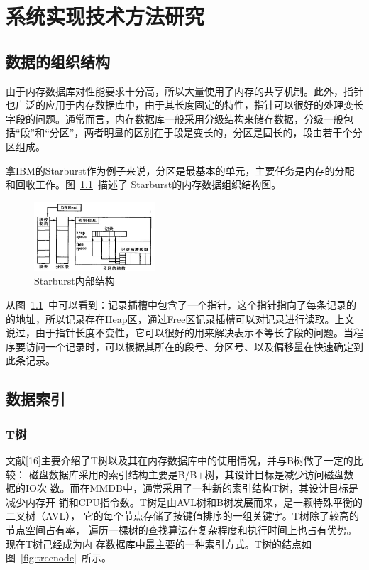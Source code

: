 \documentclass[literaturereview]{zjutreport}
\begin{document}
\chapter{系统实现技术方法研究}
\section{数据的组织结构}
由于内存数据库对性能要求十分高，所以大量使用了内存的共享机制。此外，指针也广泛的应用于内存数据库中，由于其长度固定的特性，指针可以很好的处理变长字段的问题。通常而言，内存数据库一般采用分级结构来储存数据，分级一般包括“段”和“分区”，两者明显的区别在于段是变长的，分区是固长的，段由若干个分区组成。

拿IBM的Starburst作为例子来说，分区是最基本的单元，主要任务是内存的分配和回收工作。图~\ref{fig:starburst}~描述了
Starburst的内存数据组织结构图。

\begin{figure}[htbp]
\centering
\includegraphics[width=0.4\textwidth]{starburst}
\caption{Starburst内部结构}\label{fig:starburst}
\vspace{\baselineskip}
\end{figure}

从图~\ref{fig:starburst}~中可以看到：记录插槽中包含了一个指针，这个指针指向了每条记录的的地址，所以记录存在Heap区，通过Free区记录插槽可以对记录进行读取。上文说过，由于指针长度不变性，它可以很好的用来解决表示不等长字段的问题。当程序要访问一个记录时，可以根据其所在的段号、分区号、以及偏移量在快速确定到此条记录。

\section{数据索引}
\subsection{T树}
文献[16]主要介绍了T树以及其在内存数据库中的使用情况，并与B树做了一定的比较：
磁盘数据库采用的索引结构主要是B/B$+$树，其设计目标是减少访问磁盘数据的IO次
数。而在MMDB中，通常采用了一种新的索引结构T树，其设计目标是减少内存开
销和CPU指令数。T树是由AVL树和B树发展而来，是一颗特殊平衡的二叉树（AVL），
它的每个节点存储了按键值排序的一组关键字。T树除了较高的节点空间占有率，
遍历一棵树的查找算法在复杂程度和执行时间上也占有优势。现在T树己经成为内
存数据库中最主要的一种索引方式。T树的结点如图~\ref{fig:treenode}~所示。
\end{document}
